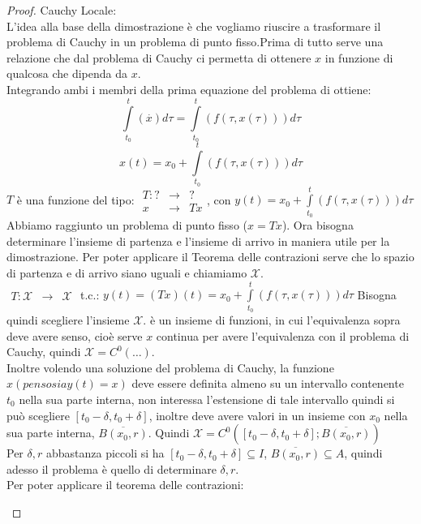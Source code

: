 \begin{proof}
	Cauchy Locale:\\
	L'idea alla base della dimostrazione è che vogliamo riuscire a trasformare il problema di Cauchy in un problema di punto fisso.Prima di tutto serve una relazione che dal problema di Cauchy ci permetta di ottenere $x$ in funzione di qualcosa che dipenda da $x$.\\
	Integrando ambi i membri della prima equazione del problema di ottiene:
	$$\int\limits_{t_0}^t(\overset{\cdot}{x})d\tau=\int\limits_{t_0}^t(f(\tau,x(\tau)))d\tau$$
	$$x(t)=x_0+\int\limits_{t_0}^t(f(\tau,x(\tau)))d\tau$$
	$T$ è una funzione del tipo:
	$\begin{array}{rcl} T: ? & \to & ? \\ x & \to & Tx \end{array}$, con $y(t)=x_0+\int\limits_{t_0}^t(f(\tau,x(\tau)))d\tau$\\
	Abbiamo raggiunto un problema di punto fisso ($x=Tx$). Ora bisogna determinare l'insieme di partenza e l'insieme di arrivo in maniera utile per la dimostrazione. Per poter applicare il Teorema delle contrazioni serve che lo spazio di partenza e di arrivo siano uguali e chiamiamo $\mathcal{X}$.\\
	$\begin{array}{rcl} T: \mathcal{X} & \to & \mathcal{X} \end{array}$ t.c.: $y(t)=(Tx)(t)=x_0+\int\limits_{t_0}^t(f(\tau,x(\tau)))d\tau$
	Bisogna quindi scegliere l'insieme $\mathcal{X}$. è un insieme di funzioni, in cui l'equivalenza sopra deve avere senso, cioè serve $x$ continua per avere l'equivalenza con il problema di Cauchy, quindi $\mathcal{X}=C^0(\ldots)$.\\
	Inoltre volendo una soluzione del problema di Cauchy, la funzione $x(penso sia y(t)=x)$ deve essere definita almeno su un intervallo contenente $t_0$ nella sua parte interna, non interessa l'estensione di tale intervallo quindi si può scegliere $\left[t_0-\delta,t_0+\delta\right]$, inoltre deve avere valori in un insieme con $x_0$ nella sua parte interna, $\overline{B(x_0,r)}$. Quindi $\mathcal{X}=C^0(\left[t_0-\delta,t_0+\delta\right];\overline{B(x_0,r)})$\\
	Per $\delta, r$ abbastanza piccoli si ha $\left[t_0-\delta,t_0+\delta\right]\subseteq I$, $\overline{B(x_0,r)}\subseteq A$, quindi adesso il problema è quello di determinare $\delta, r$.\\
	Per poter applicare il teorema delle contrazioni:
	\begin{description}

\end{description}
\end{proof}
